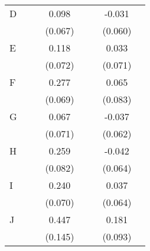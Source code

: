 \begin{longtable}{l*{3}{c}|l*{3}{c}}
		D                   &                     &                     &       0.098         &                     &                     &      -0.031         \\
		&                     &                     &     (0.067)         &                     &                     &     (0.060)         \\
		E                   &                     &                     &       0.118         &                     &                     &       0.033         \\
		&                     &                     &     (0.072)         &                     &                     &     (0.071)         \\
		F                   &                     &                     &       0.277\sym{***}&                     &                     &       0.065         \\
		&                     &                     &     (0.069)         &                     &                     &     (0.083)         \\
		G                   &                     &                     &       0.067         &                     &                     &      -0.037         \\
		&                     &                     &     (0.071)         &                     &                     &     (0.062)         \\
		H                   &                     &                     &       0.259\sym{**} &                     &                     &      -0.042         \\
		&                     &                     &     (0.082)         &                     &                     &     (0.064)         \\
		I                   &                     &                     &       0.240\sym{***}&                     &                     &       0.037         \\
		&                     &                     &     (0.070)         &                     &                     &     (0.064)         \\
		J                   &                     &                     &       0.447\sym{**} &                     &                     &       0.181         \\
		&                     &                     &     (0.145)         &                     &                     &     (0.093)         \\

\end{longtable}
